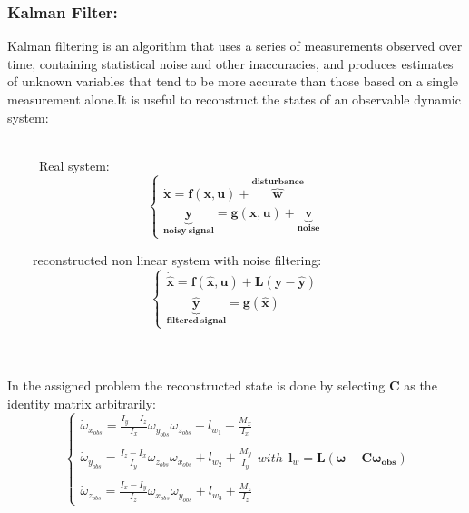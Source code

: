 \documentclass[11pt]{article}
\begin{document}
\subsubsection{Kalman Filter:}
 Kalman filtering is an algorithm that uses a series of measurements observed over time, containing statistical noise and other inaccuracies, and produces estimates of unknown variables that tend to be more accurate than those based on a single measurement alone.It is useful to reconstruct the states of an observable dynamic system:\\\\
 \begin{minipage}{.5\textwidth}
\ \ \ \ \ Real system:\\
 \begin{equation}
 \begin{cases}
 \mathbf{\dot{x}}=\mathbf{f(x,u)+\overbrace{\mathbf{w}}^{disturbance}}\\ 
 \mathbf{\underbrace{\mathbf{y}}_{noisy\  signal}}=\mathbf{g(x,u)+\underbrace{\mathbf{v}}_{noise}}
 \end{cases}
 \end{equation}
 \end{minipage}
  \begin{minipage}{.5\textwidth}
\ \ \ \ reconstructed non linear system with noise filtering:\\
 \begin{equation}
 \begin{cases}
 \mathbf{\dot{\hat{x}}}=\mathbf{f(\hat{x},u)+L(y-\hat{y})}\\ 
\mathbf{\underbrace{ \mathbf{\hat{y}}}_{filtered \ signal}}=\mathbf{g(\hat{x})}

 \end{cases}
 \end{equation}
 \end{minipage}\\\\
 In the assigned problem the reconstructed state is done  by selecting $ \mathbf{C}$ as the identity matrix arbitrarily:
 \begin{equation}
 \begin{cases}
\dot{\omega}_{x_{obs}}=\displaystyle\frac{I_y-I_z}{I_x}\omega_{y_{obs}}\omega_{z_{obs}}+{l_{w_1}}+\displaystyle\frac{M_x}{I_x}\\\\
\dot{\omega}_{y_{obs}}=\displaystyle\frac{I_z-I_x}{I_y}\omega_{z_{obs}}\omega_{x_{obs}}+{l_{w_2}}+\displaystyle\frac{M_y}{I_y}\\\\
\dot{\omega}_{z_{obs}}=\displaystyle\frac{I_x-I_y}{I_z}\omega_{x_{obs}}\omega_{y_{obs}}+{l_{w_3}}+\displaystyle\frac{M_z}{I_z}
 \end{cases}
 with \ \ \mathbf{l}_w=\mathbf{L}(\boldsymbol{\omega-C\omega_{obs}})
 \end{equation}
\end{document}
